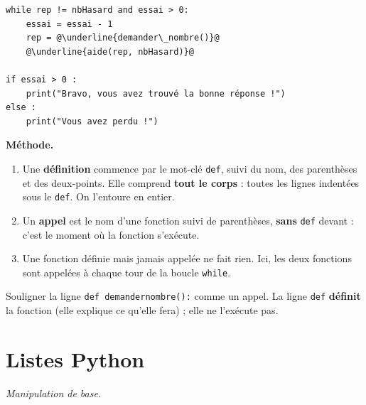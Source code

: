 \documentclass[addpoints, 11pt]{exam}
\newcommand{\enonce}[1]{\textit{#1}\par\smallskip}
\newcommand{\methode}{\par\smallskip\noindent\textbf{Méthode.}\ }
\newcommand{\code}[1]{\texttt{#1}}
\DeclareRobustCommand{\_}{\textunderscore\allowbreak}
\begin{document}
\begin{questions}
\begin{lstlisting}[escapechar=@, numbers=none]
while rep != nbHasard and essai > 0:
    essai = essai - 1
    rep = @\underline{demander\_nombre()}@
    @\underline{aide(rep, nbHasard)}@

if essai > 0 :
    print("Bravo, vous avez trouvé la bonne réponse !")
else :
    print("Vous avez perdu !")
\end{lstlisting}

\methode
\begin{enumerate}
  \item Une \textbf{définition} commence par le mot-clé \code{def}, suivi du nom, des parenthèses et des deux-points. Elle comprend \textbf{tout le corps} : toutes les lignes indentées sous le \code{def}. On l'entoure en entier.
  \item Un \textbf{appel} est le nom d'une fonction suivi de parenthèses, \textbf{sans} \code{def} devant : c'est le moment où la fonction s'exécute.
  \item Une fonction définie mais jamais appelée ne fait rien. Ici, les deux fonctions sont appelées à chaque tour de la boucle \code{while}.
\end{enumerate}
\begin{erreur}
Souligner la ligne \code{def demander\_nombre():} comme un appel. La ligne \code{def} \textbf{définit} la fonction (elle explique ce qu'elle fera) ; elle ne l'exécute pas.
\end{erreur}


\section{Listes Python}

\question[1\half] \enonce{Manipulation de base.}
\end{questions}
\end{document}
